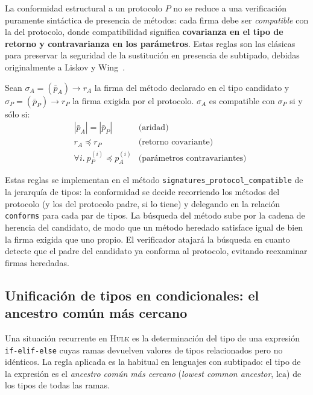 \documentclass[11pt,a4paper,oneside,openany]{report}
\newcommand{\hulk}{\textsc{Hulk}}
\newcommand{\code}[1]{\texttt{#1}}
\begin{document}
La conformidad estructural a un protocolo $P$ no se reduce a una verificación
puramente sintáctica de presencia de métodos: cada firma debe ser \emph{compatible}
con la del protocolo, donde compatibilidad significa \textbf{covarianza en el tipo
de retorno y contravarianza en los parámetros}. Estas reglas son las clásicas para
preservar la seguridad de la sustitución en presencia de subtipado, debidas
originalmente a Liskov y Wing~\cite{pierce2002}.

\begin{definition}[title={Definición: compatibilidad de firmas con varianza}]
Sean $\sigma_A = (\bar p_A) \to r_A$ la firma del método declarado en el tipo
candidato y $\sigma_P = (\bar p_P) \to r_P$ la firma exigida por el protocolo.
$\sigma_A$ es compatible con $\sigma_P$ si y sólo si:
\begin{align*}
  & |\bar p_A| = |\bar p_P|
  & \text{(aridad)} \\
  & r_A \preceq r_P
  & \text{(retorno covariante)} \\
  & \forall i.\ p_P^{(i)} \preceq p_A^{(i)}
  & \text{(parámetros contravariantes)}
\end{align*}
\end{definition}

Estas reglas se implementan en el método
\code{signatures\_protocol\_compatible} de la jerarquía de tipos: la conformidad
se decide recorriendo los métodos del protocolo (y los del protocolo padre, si
lo tiene) y delegando en la relación \code{conforms} para cada par de tipos. La
búsqueda del método sube por la cadena de herencia del candidato, de modo que un
método heredado satisface igual de bien la firma exigida que uno propio. El
verificador atajará la búsqueda en cuanto detecte que el padre del candidato ya
conforma al protocolo, evitando reexaminar firmas heredadas.

\subsection{Unificación de tipos en condicionales: el ancestro común más cercano}

Una situación recurrente en \hulk{} es la determinación del tipo de una expresión
\code{if-elif-else} cuyas ramas devuelven valores de tipos relacionados pero no
idénticos. La regla aplicada es la habitual en lenguajes con subtipado: el tipo de
la expresión es el \emph{ancestro común más cercano} (\textit{lowest common
ancestor}, $\mathrm{lca}$) de los tipos de todas las ramas.
\end{document}

